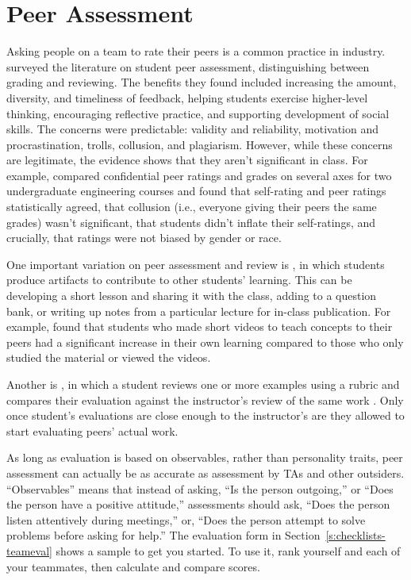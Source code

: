 \section{Peer Assessment}\label{s:individual-peer}

Asking people on a team to rate their peers is a common practice in
industry. \cite{Sond2012} surveyed the literature on student peer
assessment, distinguishing between grading and reviewing. The benefits
they found included increasing the amount, diversity, and timeliness of
feedback, helping students exercise higher-level thinking, encouraging
reflective practice, and supporting development of social skills. The
concerns were predictable: validity and reliability, motivation and
procrastination, trolls, collusion, and plagiarism. However, while these
concerns are legitimate, the evidence shows that they aren't significant
in class. For example, \cite{Kauf2000} compared confidential peer
ratings and grades on several axes for two undergraduate engineering
courses and found that self-rating and peer ratings statistically
agreed, that collusion (i.e., everyone giving their peers the same
grades) wasn't significant, that students didn't inflate their
self-ratings, and crucially, that ratings were not biased by gender or
race.

One important variation on peer assessment and review is , in which students produce
artifacts to contribute to other students' learning. This can be
developing a short lesson and sharing it with the class, adding to a
question bank, or writing up notes from a particular lecture for
in-class publication. For example, \cite{Fran2018} found that
students who made short videos to teach concepts to their peers had a
significant increase in their own learning compared to those who only
studied the material or viewed the videos.

Another is , in
which a student reviews one or more examples using a rubric and
compares their evaluation against the instructor's review of the same
work \cite{Kulk2013}. Only once student's evaluations are close
enough to the instructor's are they allowed to start evaluating peers'
actual work.

As long as evaluation is based on observables, rather than personality
traits, peer assessment can actually be as accurate as assessment by TAs
and other outsiders. ``Observables'' means that instead of asking, ``Is the
person outgoing,'' or ``Does the person have a positive attitude,''
assessments should ask, ``Does the person listen attentively during
meetings,'' or, ``Does the person attempt to solve problems before asking
for help.'' The evaluation form in Section~\ref{s:checklists-teameval} shows a
sample to get you started. To use it, rank yourself and each of your
teammates, then calculate and compare scores.

